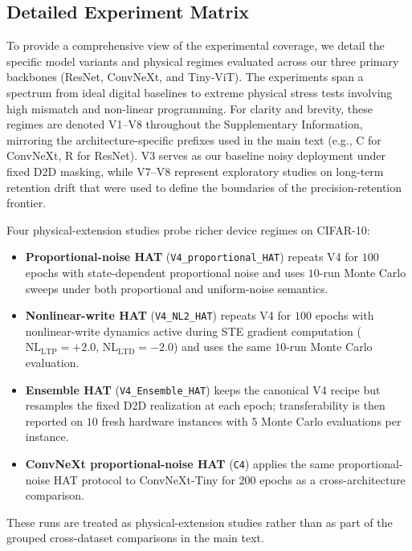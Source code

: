\subsection{Detailed Experiment Matrix}
\label{subsec:detailed-experiment-matrix}

To provide a comprehensive view of the experimental coverage, we detail the specific model variants and physical regimes evaluated across our three primary backbones (ResNet, ConvNeXt, and Tiny-ViT). The experiments span a spectrum from ideal digital baselines to extreme physical stress tests involving high mismatch and non-linear programming. For clarity and brevity, these regimes are denoted V1--V8 throughout the Supplementary Information, mirroring the architecture-specific prefixes used in the main text (e.g., C for ConvNeXt, R for ResNet). V3 serves as our baseline noisy deployment under fixed D2D masking, while V7--V8 represent exploratory studies on long-term retention drift that were used to define the boundaries of the precision-retention frontier.

Four physical-extension studies probe richer device regimes on CIFAR-10:
\begin{itemize}[leftmargin=1.4em,itemsep=2pt,topsep=2pt]
    \item \textbf{Proportional-noise HAT} (\texttt{V4\_proportional\_HAT}) repeats V4 for \(100\) epochs with state-dependent proportional noise and uses \(10\)-run Monte Carlo sweeps under both proportional and uniform-noise semantics.
    \item \textbf{Nonlinear-write HAT} (\texttt{V4\_NL2\_HAT}) repeats V4 for \(100\) epochs with nonlinear-write dynamics active during STE gradient computation (\(\mathrm{NL}_{\mathrm{LTP}}=+2.0\), \(\mathrm{NL}_{\mathrm{LTD}}=-2.0\)) and uses the same \(10\)-run Monte Carlo evaluation.
    \item \textbf{Ensemble HAT} (\texttt{V4\_Ensemble\_HAT}) keeps the canonical V4 recipe but resamples the fixed D2D realization at each epoch; transferability is then reported on \(10\) fresh hardware instances with \(5\) Monte Carlo evaluations per instance.
    \item \textbf{ConvNeXt proportional-noise HAT} (\texttt{C4}) applies the same proportional-noise HAT protocol to ConvNeXt-Tiny for \(200\) epochs as a cross-architecture comparison.
\end{itemize}
These runs are treated as physical-extension studies rather than as part of the grouped cross-dataset comparisons in the main text.

